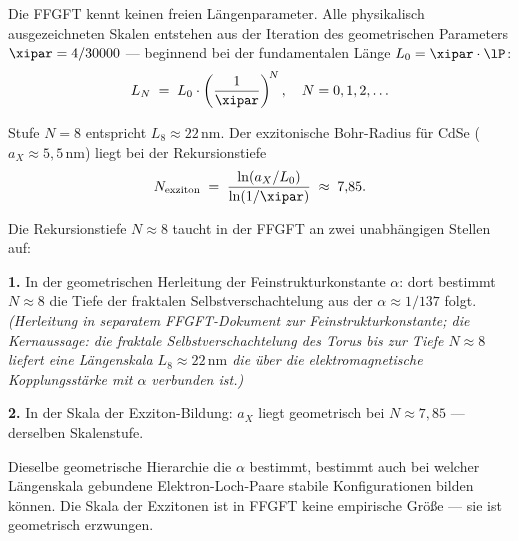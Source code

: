 Die FFGFT kennt keinen freien Längenparameter.
Alle physikalisch ausgezeichneten Skalen entstehen aus der
Iteration des geometrischen Parameters $\xipar = 4/30000$
--- beginnend bei der fundamentalen Länge
$L_0 = \xipar \cdot \lP$:
\begin{equation}
  L_N \;=\; L_0 \cdot \left(\frac{1}{\xipar}\right)^{\!N},
  \quad N = 0, 1, 2, \ldots
\end{equation}

\begin{center}
\end{center}

Stufe $N = 8$ entspricht $L_8 \approx 22$\,nm.
Der exzitonische Bohr-Radius für CdSe ($a_X \approx 5{,}5$\,nm)
liegt bei der Rekursionstiefe
\begin{equation}
  N_{\text{exziton}} \;=\;
  \frac{\ln(a_X / L_0)}{\ln(1/\xipar)} \;\approx\; 7{,}85.
\end{equation}

\begin{foundation}
Die Rekursionstiefe $N \approx 8$ taucht in der FFGFT
an zwei unabhängigen Stellen auf:

\textbf{1.} In der geometrischen Herleitung der Feinstrukturkonstante $\alpha$:
dort bestimmt $N \approx 8$ die Tiefe der fraktalen Selbstverschachtelung
aus der $\alpha \approx 1/137$ folgt.
\emph{(Herleitung in separatem FFGFT-Dokument zur Feinstrukturkonstante;
die Kernaussage: die fraktale Selbstverschachtelung des Torus
bis zur Tiefe $N \approx 8$ liefert eine Längenskala $L_8 \approx 22\,\text{nm}$
die über die elektromagnetische Kopplungsstärke mit $\alpha$ verbunden ist.)}

\textbf{2.} In der Skala der Exziton-Bildung: $a_X$ liegt geometrisch
bei $N \approx 7{,}85$ --- derselben Skalenstufe.

Dieselbe geometrische Hierarchie die $\alpha$ bestimmt,
bestimmt auch bei welcher Längenskala gebundene
Elektron-Loch-Paare stabile Konfigurationen bilden können.
Die Skala der Exzitonen ist in FFGFT keine empirische Größe ---
sie ist geometrisch erzwungen.
\end{foundation}

